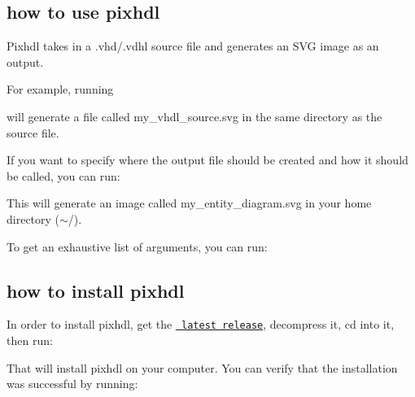 \subsection*{how to use pixhdl}

Pixhdl takes in a {\ttfamily .vhd}/{\ttfamily .vdhl} source file and generates an S\+VG image as an output.

For example, running


\begin{DoxyCode}{0}
\end{DoxyCode}


will generate a file called {\ttfamily my\+\_\+vhdl\+\_\+source.\+svg} in the same directory as the source file.

If you want to specify where the output file should be created and how it should be called, you can run\+:


\begin{DoxyCode}{0}
\end{DoxyCode}


This will generate an image called {\ttfamily my\+\_\+entity\+\_\+diagram.\+svg} in your home directory ({\ttfamily $\sim$/}).

To get an exhaustive list of arguments, you can run\+:


\begin{DoxyCode}{0}
\end{DoxyCode}


\subsection*{how to install pixhdl}

In order to install pixhdl, get the \href{https://github.com/kokkonisd/pixhdl/releases/latest}{\texttt{ latest release}}, decompress it, {\ttfamily cd} into it, then run\+:


\begin{DoxyCode}{0}
\end{DoxyCode}


That will install pixhdl on your computer. You can verify that the installation was successful by running\+:


\begin{DoxyCode}{0}
\end{DoxyCode}


